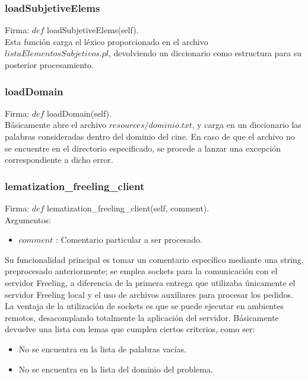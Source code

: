 \documentclass[12pt]{article}
\begin{document}
\subsubsection{loadSubjetiveElems}
Firma: $def$ loadSubjetiveElems(self). \\
Esta función carga el léxico proporcionado en el archivo $listaElementosSubjetivos.pl$, devolviendo un diccionario como estructura para su posterior procesamiento.

\subsubsection{loadDomain}\label{func:loadDomain}
Firma: $def$ loadDomain(self). \\
Básicamente abre el archivo $resources/dominio.txt$, y carga en un diccionario las palabras consideradas dentro del dominio del cine. En caso de que el archivo no se encuentre en el directorio especificado, se procede a lanzar una excepción correspondiente a dicho error.

\subsubsection{lematization\_freeling\_client}
Firma: $def$ lematization\_freeling\_client(self, comment). \\
Argumentos:
\begin{itemize}
  \item $comment$ : Comentario particular a ser procesado.
\end{itemize}
Su funcionalidad principal es tomar un comentario específico mediante una string, preprocesado anteriormente; se emplea sockets para la comunicación con el servidor Freeling, a diferencia de la primera entrega que utilizaba únicamente el servidor Freeling local y el uso de archivos auxiliares para procesar los pedidos. La ventaja de la utilización de sockets es que se puede ejecutar en ambientes remotos, desacomplando totalmente la aplicación del servidor. Básicamente devuelve una lista con lemas que cumplen ciertos criterios, como ser:
\begin{itemize}
  \item No se encuentra en la lista de palabras vacías.
  \item No se encuentra en la lista del dominio del problema.
\end{itemize}
\end{document}
